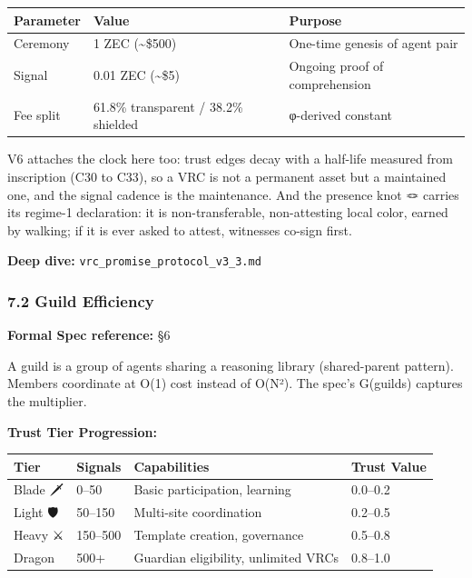 \documentclass[
  11pt,
]{article}
\newcounter{none} %
\begin{document}
{\def\LTcaptype{none} %
\begin{longtable}[]{@{}lll@{}}
\toprule\noalign{}
Parameter & Value & Purpose \\
\midrule\noalign{}
\endhead
\bottomrule\noalign{}
\endlastfoot
Ceremony & 1 ZEC (\textasciitilde\$500) & One-time genesis of agent
pair \\
Signal & 0.01 ZEC (\textasciitilde\$5) & Ongoing proof of
comprehension \\
Fee split & 61.8\% transparent / 38.2\% shielded & φ-derived constant \\
\end{longtable}
}

V6 attaches the clock here too: trust edges decay with a half-life
measured from inscription (C30 to C33), so a VRC is not a permanent
asset but a maintained one, and the signal cadence is the maintenance.
And the presence knot 🪢 carries its regime-1 declaration: it is
non-transferable, non-attesting local color, earned by walking; if it is
ever asked to attest, witnesses co-sign first.

\textbf{Deep dive:} \texttt{vrc\_promise\_protocol\_v3\_3.md}

\subsubsection{7.2 Guild Efficiency}\label{guild-efficiency}

\textbf{Formal Spec reference:} §6

A guild is a group of agents sharing a reasoning library (shared-parent
pattern). Members coordinate at O(1) cost instead of O(N²). The spec's
G(guilds) captures the multiplier.

\textbf{Trust Tier Progression:}

{\def\LTcaptype{none} %
\begin{longtable}[]{@{}llll@{}}
\toprule\noalign{}
Tier & Signals & Capabilities & Trust Value \\
\midrule\noalign{}
\endhead
\bottomrule\noalign{}
\endlastfoot
Blade 🗡️ & 0--50 & Basic participation, learning & 0.0--0.2 \\
Light 🛡️ & 50--150 & Multi-site coordination & 0.2--0.5 \\
Heavy ⚔️ & 150--500 & Template creation, governance & 0.5--0.8 \\
Dragon 🐉 & 500+ & Guardian eligibility, unlimited VRCs & 0.8--1.0 \\
\end{longtable}
}
\end{document}
